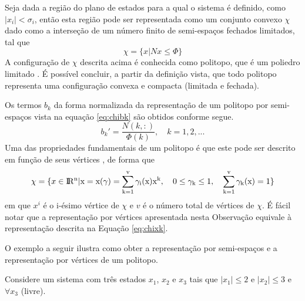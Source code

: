 \begin{observation}Seja dada a região do plano de estados para a qual o sistema é definido, como $|x_i| < \sigma_i$, então esta região pode ser representada como um conjunto convexo $\chi$ dado como a interseção de um número finito de semi-espaços fechados limitados, tal que
	\begin{equation*}
	\chi = \{x | Nx \leq \Phi\}
	\end{equation*}
	A configuração de $\chi$ descrita acima é conhecida como politopo, que é um poliedro limitado \cite{inproc:MPT:2006}. É possível concluir, a partir da definição vista, que todo politopo representa uma configuração convexa e compacta (limitada e fechada).
	
	Os termos $b_k$ da forma normalizada da representação de um politopo por semi-espaços vista na equação \ref{eq:chibk} são obtidos conforme segue.
	\begin{equation*}
	b_k' = \dfrac{N(k, :)}{\Phi(k)},\quad k = 1, 2, ...
	\end{equation*}
	Uma das propriedades fundamentais de um politopo é que este pode ser descrito em função de seus vértices \cite{inproc:MPT:2006}, de forma que
	\begin{equation}\label{eq:chixk_simplex}
	\chi = \{x \in \rm I\!R^{n} | x = x(\gamma) = \sum_{k = 1}^{v} \gamma_i(x)x^k,\quad 0 \leq \gamma_k \leq 1,\quad \sum_{k = 1}^{v} \gamma_k(x) = 1\}
	\end{equation}
	em que $x^i$ é o i-ésimo vértice de $\chi$ e $v$ é o número total de vértices de $\chi$. É fácil notar que a representação por vértices apresentada nesta Observação equivale \`{a} representação descrita na Equação \ref{eq:chixk}.
	
	O exemplo a seguir ilustra como obter a representação por semi-espaços e a representação por vértices de um politopo.
	\begin{example}\label{exe:rep_politopica}
		Considere um sistema com três estados $x_1$, $x_2$ e $x_3$ tais que $|x_1| \leq 2$ e $|x_2| \leq 3$ e $\forall x_3$ (livre).
		

\end{example}
\end{observation}
